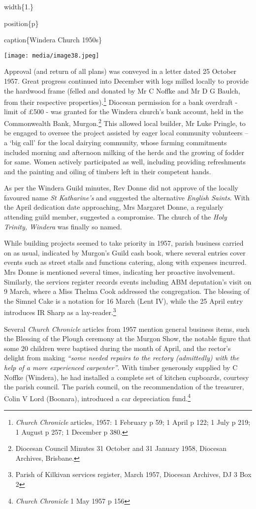 width\{1.\}

position\{p\}

caption\{Windera Church 1950s\}

\texttt{[image: media/image38.jpeg]}

Approval (and return of all plans) was conveyed in a letter dated 25 October 1957. Great progress continued into December with logs milled locally to provide the hardwood frame (felled and donated by Mr C Noffke and Mr D G Baulch, from their respective properties).\footnote{\emph{Church Chronicle} articles, 1957: 1 February p 59; 1 April p 122; 1 July p 219; 1 August p 257; 1 December p 380.} Diocesan permission for a bank overdraft - limit of £500 - was granted for the Windera church's bank account, held in the Commonwealth Bank, Murgon.\footnote{Diocesan Council Minutes 31 October and 31 January 1958, Diocesan Archives, Brisbane.} This allowed local builder, Mr Luke Pringle, to be engaged to oversee the project assisted by eager local community volunteers -- a `big call' for the local dairying community, whose farming commitments included morning and afternoon milking of the herds and the growing of fodder for same. Women actively participated as well, including providing refreshments and the painting and oiling of timbers left in their competent hands.

As per the Windera Guild minutes, Rev Donne did not approve of the locally favoured name \emph{St Katharine's} and suggested the alternative \emph{English Saints}. With the April dedication date approaching, Mrs Margaret Donne, a regularly attending guild member, suggested a compromise. The church of the \emph{Holy Trinity, Windera} was finally so named.

While building projects seemed to take priority in 1957, parish business carried on as usual, indicated by Murgon's Guild cash book, where several entries cover events such as street stalls and functions catering, along with expenses incurred. Mrs Donne is mentioned several times, indicating her proactive involvement. Similarly, the services register records events including ABM deputation's visit on 9 March, where a Miss Thelma Cook addressed the congregation. The blessing of the Simnel Cake is a notation for 16 March (Lent IV), while the 25 April entry introduces IR Sharp as a lay-reader.\footnote{Parish of Kilkivan services register, March 1957, Diocesan Archives, DJ 3 Box 2}

Several \emph{Church Chronicle} articles from 1957 mention general business items, such the Blessing of the Plough ceremony at the Murgon Show, the notable figure that some 20 children were baptised during the month of April, and the rector's delight from making \emph{``some needed repairs to the rectory (admittedly) with the help of a more experienced carpenter''}. With timber generously supplied by C Noffke (Windera), he had installed a complete set of kitchen cupboards, courtesy the parish council. The parish council, on the recommendation of the treasurer, Colin V Lord (Boonara), introduced a car depreciation fund.\footnote{\emph{Church Chronicle} 1 May 1957 p 156}

